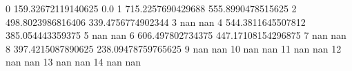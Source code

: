0 159.32672119140625 0.0
1 715.2257690429688 555.8990478515625
2 498.8023986816406 339.4756774902344
3 nan nan
4 544.3811645507812 385.054443359375
5 nan nan
6 606.497802734375 447.17108154296875
7 nan nan
8 397.4215087890625 238.09478759765625
9 nan nan
10 nan nan
11 nan nan
12 nan nan
13 nan nan
14 nan nan
